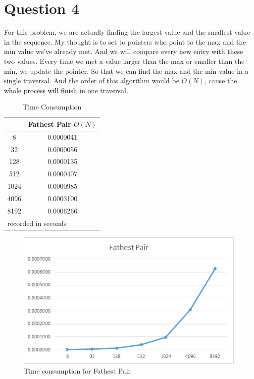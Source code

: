 \documentclass[conference]{IEEEtran}
\begin{document}
\section*{Question 4}
For this problem, we are actually finding the largest value and the smallest value in the 
sequence. My thought is to set to pointers who point to the max and the min value we've 
already met. And we will compare every new entry with these two values. Every time we met a 
value larger than the max or smaller than the min, we update the pointer. So that we can 
find the max and the min value in a single traversal. And the order of this algorithm would 
be $O(N)$, cause the whole process will finish in one traversal.

\begin{table}[H]
    \caption{Time Consumption}
    \begin{center}
        \begin{tabular}{|c|c|}
            \hline
             & Fathest Pair $O(N)$\\
            \hline
            8	&0.0000041\\
            \hline
            32	&0.0000056\\
            \hline
            128	&0.0000135\\
            \hline
            512	&0.0000407\\
            \hline
            1024&	0.0000985\\
            \hline
            4096&	0.0003100\\
            \hline
            8192&	0.0006266\\
            \hline
            \multicolumn{2}{l}{recorded in seconds}\\
        \end{tabular}
    \end{center}
\end{table}

\begin{figure}[H]
    \centerline{\includegraphics[scale=0.5]{Pic/fig4.png}}
    \caption{Time consumption for Fathest Pair}
\end{figure}
\end{document}

